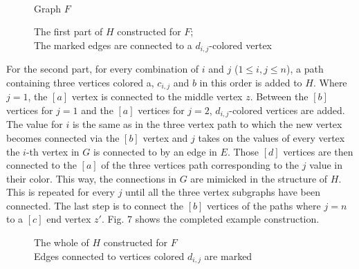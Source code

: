 \documentclass[12pt,a4paper]{article}
\begin{document}
\newline
\begin{figure}[h]
\begin{minipage}{0.2\linewidth}
	
	\caption{\\Graph $F$}
\end{minipage}
\begin{minipage}{0.8\linewidth}
	
	\caption{The first part of $H$ constructed for $F$; \\The marked edges are connected to a $d_{i,j}$-colored vertex}
\end{minipage}
\end{figure}
\newpage
For the second part, for every combination of $i$ and $j$ ($1 \leq i, j \leq n$), a path containing three vertices colored a, $c_{i,j}$ and $b$ in this order is added to $H$. Where $j = 1$, the $[a]$ vertex is connected to the middle vertex $z$. Between the $[b]$ vertices for $j = 1$ and the $[a]$ vertices for $j = 2$, $d_{i,j}$-colored vertices are added. The value for $i$ is the same as in the three vertex path to which the new vertex becomes connected via the $[b]$ vertex and $j$ takes on the values of every vertex the $i$-th vertex in $G$ is connected to by an edge in $E$. Those $[d]$ vertices are then connected to the $[a]$ of the three vertices path corresponding to the $j$ value in their color. This way, the connections in $G$ are mimicked in the structure of $H$. This is repeated for every $j$ until all the three vertex subgraphs have been connected. The last step is to connect the $[b]$ vertices of the paths where $j = n$ to a $[c]$ end vertex $z'$. Fig. 7 shows the completed example construction.
\begin{figure}[h]
	
	\caption{The whole of $H$ constructed for $F$ \\ Edges connected to vertices colored $d_{i,j}$ are marked}
\end{figure}
\end{document}
